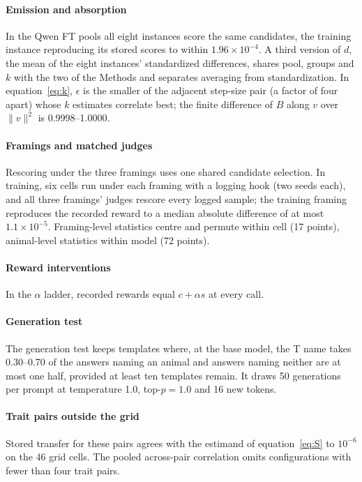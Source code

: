 \paragraph{Emission and absorption}
In the Qwen FT pools all eight instances score the same candidates, the training instance reproducing its stored scores to within $1.96 \times 10^{-4}$. A third version of $d$, the mean of the eight instances' standardized differences, shares pool, groups and $k$ with the two of the Methods and separates averaging from standardization. In equation~\eqref{eq:k}, $\epsilon$ is the smaller of the adjacent step-size pair (a factor of four apart) whose $k$ estimates correlate best; the finite difference of $B$ along $v$ over $\lVert v \rVert^2$ is 0.9998--1.0000.

\paragraph{Framings and matched judges}
Rescoring under the three framings uses one shared candidate selection. In training, six cells run under each framing with a logging hook (two seeds each), and all three framings' judges rescore every logged sample; the training framing reproduces the recorded reward to a median absolute difference of at most $1.1 \times 10^{-5}$. Framing-level statistics centre and permute within cell (17 points), animal-level statistics within model (72 points).

\paragraph{Reward interventions}
In the $\alpha$ ladder, recorded rewards equal $c + \alpha s$ at every call.

\paragraph{Generation test}
The generation test keeps templates where, at the base model, the T name takes 0.30--0.70 of the answers naming an animal and answers naming neither are at most one half, provided at least ten templates remain. It draws 50 generations per prompt at temperature 1.0, top-$p = 1.0$ and 16 new tokens.

\paragraph{Trait pairs outside the grid}
Stored transfer for these pairs agrees with the estimand of equation~\eqref{eq:S} to $10^{-6}$ on the 46 grid cells. The pooled across-pair correlation omits configurations with fewer than four trait pairs.

